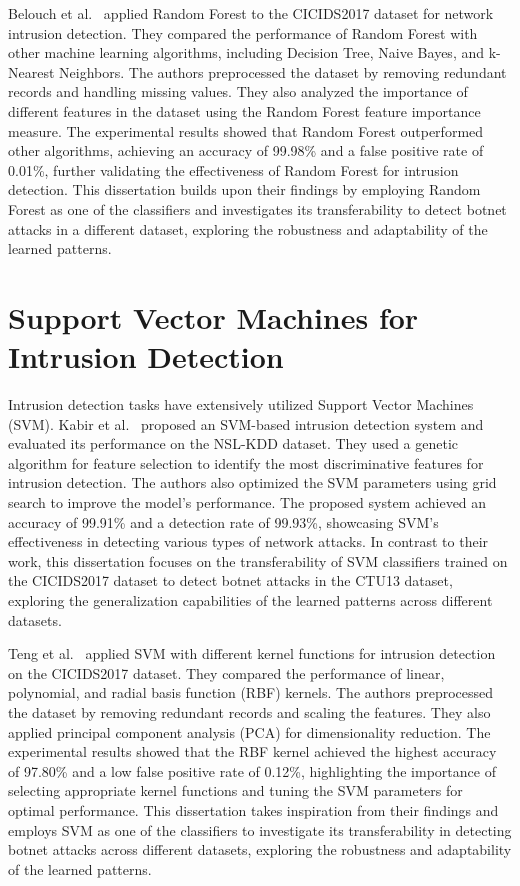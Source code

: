 Belouch et al.~\cite{belouch2018performance} applied Random Forest to the CICIDS2017 dataset for network intrusion detection. They compared the performance of Random Forest with other machine learning algorithms, including Decision Tree, Naive Bayes, and k-Nearest Neighbors. The authors preprocessed the dataset by removing redundant records and handling missing values. They also analyzed the importance of different features in the dataset using the Random Forest feature importance measure. The experimental results showed that Random Forest outperformed other algorithms, achieving an accuracy of 99.98\% and a false positive rate of 0.01\%, further validating the effectiveness of Random Forest for intrusion detection. This dissertation builds upon their findings by employing Random Forest as one of the classifiers and investigates its transferability to detect botnet attacks in a different dataset, exploring the robustness and adaptability of the learned patterns.

\section{Support Vector Machines for Intrusion Detection}

Intrusion detection tasks have extensively utilized Support Vector Machines (SVM). Kabir et al.~\cite{kabir2017network} proposed an SVM-based intrusion detection system and evaluated its performance on the NSL-KDD dataset. They used a genetic algorithm for feature selection to identify the most discriminative features for intrusion detection. The authors also optimized the SVM parameters using grid search to improve the model's performance. The proposed system achieved an accuracy of 99.91\% and a detection rate of 99.93\%, showcasing SVM's effectiveness in detecting various types of network attacks. In contrast to their work, this dissertation focuses on the transferability of SVM classifiers trained on the CICIDS2017 dataset to detect botnet attacks in the CTU13 dataset, exploring the generalization capabilities of the learned patterns across different datasets.

Teng et al.~\cite{teng2017svm} applied SVM with different kernel functions for intrusion detection on the CICIDS2017 dataset. They compared the performance of linear, polynomial, and radial basis function (RBF) kernels. The authors preprocessed the dataset by removing redundant records and scaling the features. They also applied principal component analysis (PCA) for dimensionality reduction. The experimental results showed that the RBF kernel achieved the highest accuracy of 97.80\% and a low false positive rate of 0.12\%, highlighting the importance of selecting appropriate kernel functions and tuning the SVM parameters for optimal performance. This dissertation takes inspiration from their findings and employs SVM as one of the classifiers to investigate its transferability in detecting botnet attacks across different datasets, exploring the robustness and adaptability of the learned patterns.

